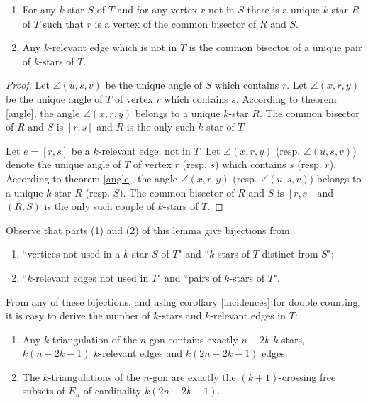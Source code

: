 \documentclass[12pt]{amsart}
\begin{document}
\begin{corollary}\label{findingstars}
\begin{enumerate}
\item For any $k$-star $S$ of $T$ and for any vertex $r$ not in $S$ there is a unique $k$-star $R$ of $T$ such that $r$ is a vertex of the common bisector of $R$ and $S$.
\item Any $k$-relevant edge which is not in $T$ is the common bisector of a unique pair of $k$-stars of $T$.
\end{enumerate}
\end{corollary}

\begin{proof}
Let $\angle(u,s,v)$ be the unique angle of $S$ which contains $r$. Let $\angle(x,r,y)$ be the unique angle of $T$ of vertex $r$ which contains $s$. According to theorem \ref{angle}, the angle $\angle(x,r,y)$ belongs to a unique $k$-star $R$. The common bisector of $R$ and $S$ is $[r,s]$ and $R$ is the only such $k$-star of $T$.

Let $e=[r,s]$ be a $k$-relevant edge, not in $T$. Let $\angle(x,r,y)$ (resp. $\angle(u,s,v)$) denote the unique angle of $T$ of vertex $r$ (resp. $s$) which contains $s$ (resp. $r$). According to theorem \ref{angle}, the angle $\angle(x,r,y)$ (resp. $\angle(u,s,v)$) belongs to a unique $k$-star $R$ (resp. $S$). The common bisector of $R$ and $S$ is $[r,s]$ and $(R,S)$ is the only such couple of $k$-stars of $T$.
\end{proof}

Observe that parts (1) and (2) of this lemma give bijections from 
\begin{enumerate}
\item ``vertices not used in a $k$-star $S$ of $T$" and ``$k$-stars of $T$ distinct from $S$";
\item ``$k$-relevant edges not used in $T$" and ``pairs of $k$-stars of $T$".
\end{enumerate}
From any of these bijections, and using corollary \ref{incidences} for double counting, it is easy to derive the number of $k$-stars and $k$-relevant edges in $T$:

\begin{corollary}\label{starsenumeration}
\begin{enumerate}
\item Any $k$-triangulation of the $n$-gon contains exactly $n-2k$ $k$-stars, $k(n-2k-1)$ $k$-relevant edges and $k(2n-2k-1)$ edges.
\item The $k$-triangulations of the $n$-gon are exactly the $(k+1)$-crossing free subsets of $E_n$ of cardinality $k(2n-2k-1)$.
\end{enumerate}
\end{corollary}
\end{document}
